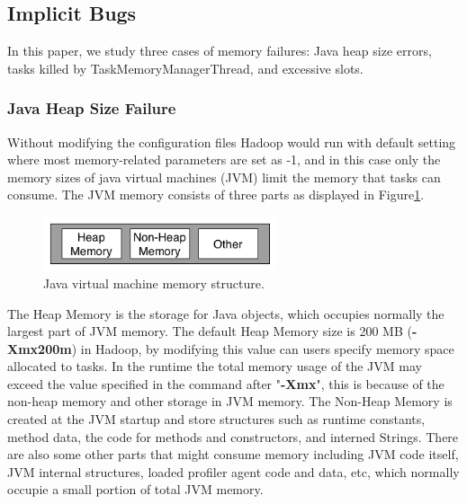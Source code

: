 \subsection{Implicit Bugs}
In this paper, we study three cases of memory failures: Java heap size errors, tasks killed by TaskMemoryManagerThread, and excessive slots.
\subsubsection{Java Heap Size Failure}
Without modifying the configuration files Hadoop would run with default setting where most memory-related parameters are set as -1, and in this case only the memory sizes of java virtual machines (JVM) limit the memory that tasks can consume.
The JVM memory consists of three parts as displayed in Figure\ref{ref:heap_structure}.
\par
\begin{figure}[ht]
  \centering
    \includegraphics[width=2.7in]{image/Jvm_Heap.png}
    \caption{Java virtual machine memory structure.}
    \label{ref:heap_structure}
\end{figure}
The Heap Memory is the storage for Java objects, which occupies normally the largest part of JVM memory. The default Heap Memory size is 200 MB ({\bf -Xmx200m}) in Hadoop, by modifying this value can users specify memory space allocated to tasks.
In the runtime the total memory usage of the JVM may exceed the value specified in the command after "{\bf -Xmx}", this is because of the non-heap memory and other storage in JVM memory.
The Non-Heap Memory  is created at the JVM startup and store structures such as runtime constants, method data, the code for methods and constructors, and interned Strings.
There are also some other parts that might consume memory including JVM code itself, JVM internal structures, loaded profiler agent code and data, etc, which normally occupie a small portion of total JVM memory. 

